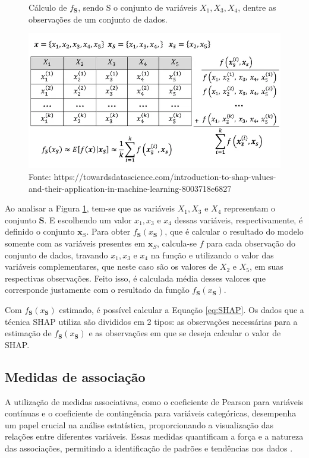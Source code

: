 \begin{figure}[H]
    \centering
    \caption{Cálculo de $f_{\textbf{S}}$, sendo S o conjunto de variáveis $X_1, X_3, X_4$, dentre as observações de um conjunto de dados.}
    \includegraphics[scale=0.5]{imagens/shap_explicado.png}
    \caption*{Fonte: https://towardsdatascience.com/introduction-to-shap-values-and-their-application-in-machine-learning-8003718e6827}
    \label{fig:calculo_esforço}   
\end{figure}

Ao analisar a Figura \ref{fig:calculo_esforço}, tem-se que as variáveis $X_1, X_3$ e $ X_4$ representam o conjunto $\textbf{S}$. 
E escolhendo um valor $x_1, x_3$ e $ x_4$ dessas variáveis, respectivamente, é definido o conjunto $\textbf{x}_S$. 
Para obter $f_{\textbf{S}}(x_{\textbf{S}})$, que é calcular o resultado do modelo somente com as variáveis presentes 
em $\textbf{x}_S$, calcula-se $f$ para cada observação do conjunto de dados,
travando $x_1, x_3$ e $ x_4$ na função e utilizando o valor das variáveis complementares, que neste caso são os
valores de $X_2$ e $X_5$, em suas respectivas observações. Feito isso, é calculada média desses valores que
corresponde justamente com o resultado da função $f_{\textbf{S}}(x_{\textbf{S}})$.

Com $f_{\textbf{S}}(x_{\textbf{S}})$ estimado, é possível calcular a Equação \ref{eq:SHAP}. Os dados que a técnica SHAP 
utiliza são divididos em 2 tipos: as observações necessárias para a estimação de $f_{\textbf{S}}(x_{\textbf{S}})$
e as observações em que se deseja calcular o valor de SHAP. 


\subsection{Medidas de associação}


A utilização de medidas associativas, como o coeficiente de Pearson para variáveis contínuas e o coeficiente de
contingência para variáveis categóricas, desempenha um papel crucial na análise estatística, proporcionando a
visualização das relações entre diferentes variáveis. Essas medidas quantificam a força e a natureza das associações, 
permitindo a identificação de padrões e tendências nos dados \cite{witte_statistics}. 

